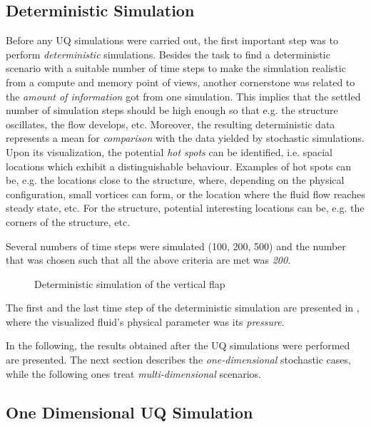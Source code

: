 \subsection{Deterministic Simulation}
\label{Deterministic Simulation}	
	Before any UQ simulations were carried out, the first important step was to perform \emph{deterministic} simulations. Besides the task to find a deterministic scenario with a suitable number of time steps to make the simulation realistic from a compute and memory point of views, another cornerstone was related to the \emph{amount of information} got from one simulation. This implies that the settled number of simulation steps should
be high enough so that e.g.  the structure oscillates, the flow develops, etc. Moreover, the resulting deterministic data represents a mean for \emph{comparison} with the data yielded by stochastic simulations. Upon its visualization, the potential \emph{hot spots} can be identified, i.e. spacial locations which exhibit a distinguishable behaviour. Examples of hot spots can be, e.g. the locations close to the structure, where, depending on the physical configuration, small vortices can form, or the location where the fluid flow reaches steady state, etc. For the structure, potential interesting locations can be, e.g. the corners of the structure, etc. 

	Several numbers of time steps were simulated (100, 200, 500) and the number that was chosen such that all the above criteria are met was \emph{200}. 
\begin{figure}[htbp]
  \centering
  \hfill
  \caption{Deterministic simulation of the vertical flap}
  \label{Flap3Det}
  \vspace{-0.4cm}
\end{figure}
The first and the last time step of the deterministic simulation are presented in , where the visualized fluid's physical parameter was its \emph{pressure}. 

	In the following, the results obtained after the UQ simulations were performed are presented. The next section describes the \emph{one-dimensional} stochastic cases, while the following ones treat \emph{multi-dimensional} scenarios.
\subsection{One Dimensional UQ Simulation}
\label{subsec:1D UQ Simulations}
		
